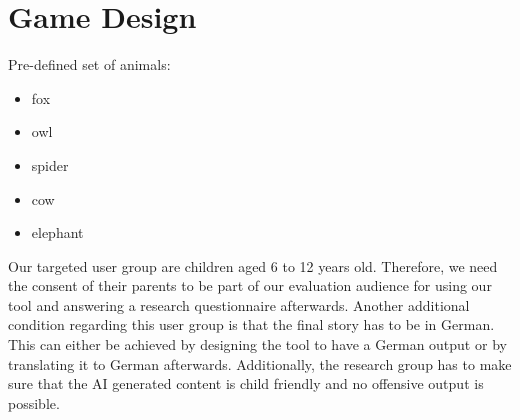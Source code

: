 \section{Game Design}
Pre-defined set of animals:
\begin{itemize}
    \item fox
    \item owl
    \item spider
    \item cow
    \item elephant
  \end{itemize}

  Our targeted user group are children aged 6 to 12 years old. Therefore, we need the consent of their parents to be part of our evaluation audience for using our tool and answering a research questionnaire afterwards. Another additional condition regarding this user group is that the final story has to be in German. This can either be achieved by designing the tool to have a German output or by translating it to German afterwards. Additionally, the research group has to make sure that the AI generated content is child friendly and no offensive output is possible.
